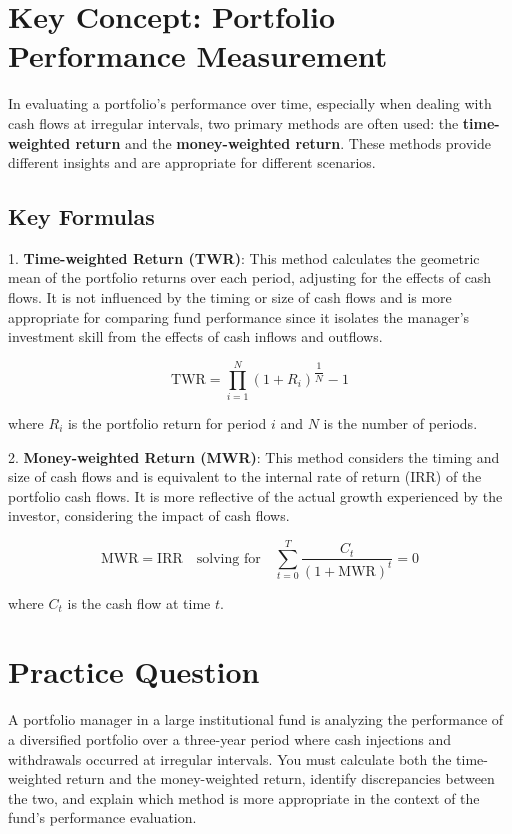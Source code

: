 \section*{Key Concept: Portfolio Performance Measurement}

In evaluating a portfolio's performance over time, especially when dealing with cash flows at irregular intervals, two primary methods are often used: the \textbf{time-weighted return} and the \textbf{money-weighted return}. These methods provide different insights and are appropriate for different scenarios.

\subsection*{Key Formulas}

1. \textbf{Time-weighted Return (TWR)}: This method calculates the geometric mean of the portfolio returns over each period, adjusting for the effects of cash flows. It is not influenced by the timing or size of cash flows and is more appropriate for comparing fund performance since it isolates the manager's investment skill from the effects of cash inflows and outflows.

   \[
   \text{TWR} = \prod_{i=1}^{N} (1 + R_i)^{\dfrac{1}{N}} - 1
   \]

   where \( R_i \) is the portfolio return for period \( i \) and \( N \) is the number of periods.

2. \textbf{Money-weighted Return (MWR)}: This method considers the timing and size of cash flows and is equivalent to the internal rate of return (IRR) of the portfolio cash flows. It is more reflective of the actual growth experienced by the investor, considering the impact of cash flows.

   \[
   \text{MWR} = \text{IRR} \quad \text{solving for} \quad \sum_{t=0}^{T} \dfrac{C_t}{(1 + \text{MWR})^t} = 0
   \]

   where \( C_t \) is the cash flow at time \( t \).

\section*{Practice Question}
A portfolio manager in a large institutional fund is analyzing the performance of a diversified portfolio over a three-year period where cash injections and withdrawals occurred at irregular intervals. You must calculate both the time-weighted return and the money-weighted return, identify discrepancies between the two, and explain which method is more appropriate in the context of the fund's performance evaluation.

